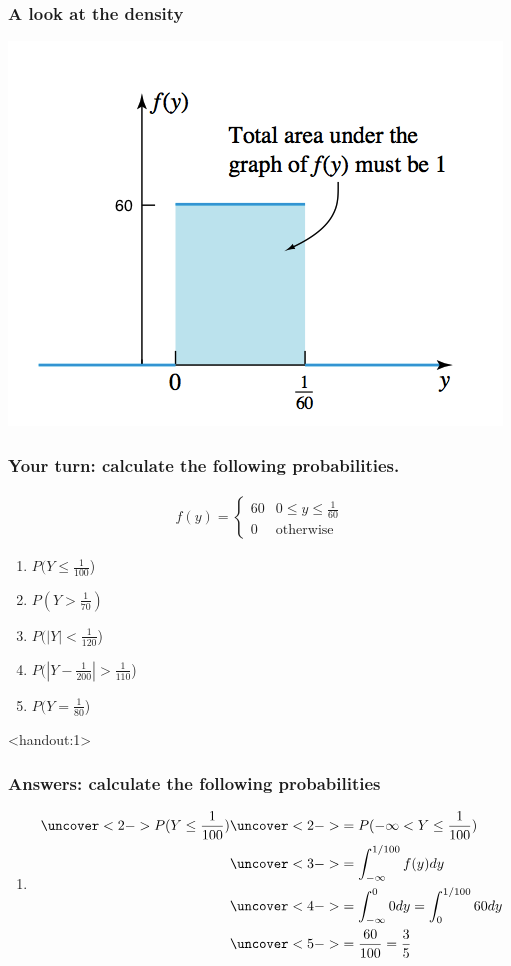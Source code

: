 \documentclass[handout]{beamer}\usepackage{graphicx, color}
\newcommand{\answers}{1}
\numberwithin{equation}{section}
\begin{document}
\begin{frame}
\frametitle{A look at the density}
 \includegraphics{../../fig/delaypict.png}
\end{frame}

\begin{frame}
\frametitle{Your turn: calculate the following probabilities.}
\begin{align*}
f(y) = \begin{cases}
60 & 0 \le y \le \frac{1}{60} \\
0 & \text{otherwise}
\end{cases}
\end{align*}

\begin{enumerate}[1. ]
\item $P(Y \le \frac{1}{100}$)
\item $P(Y > \frac{1}{70})$
\item $P(|Y| < \frac{1}{120}$)
\item $P(\left |Y - \frac{1}{200} \right | > \frac{1}{110}$)
\item $P(Y = \frac{1}{80}$)
\end{enumerate}
\end{frame}






\begin{frame}<handout:\answers>
\frametitle{Answers: calculate the following probabilities} \small
\begin{enumerate}[1. ]
\item 
\begin{align*}
\uncover<2->{ P(Y \le \frac{1}{100})} &\uncover<2->{  = P(-\infty < Y \le \frac{1}{100})} \\
&\uncover<3->{  = \int_{-\infty}^{1/100} f(y) dy} \\
& \uncover<4->{ = \int_{-\infty}^0 0 dy = \int_{0}^{1/100} 60 dy} \\
& \uncover<5->{ = \frac{60}{100} = \frac{3}{5}}
\end{align*}
\end{enumerate}
\end{frame}
\end{document}
